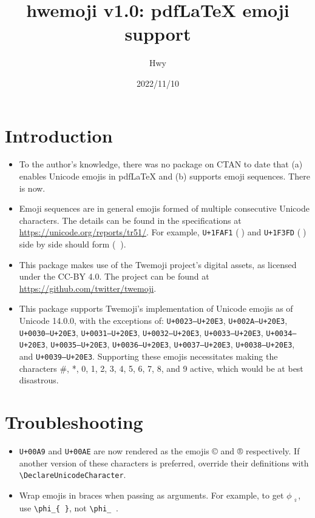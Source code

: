\documentclass{article}
\title{hwemoji v1.0: pdf\LaTeX{} emoji support}
\author{Hwy}
\date{2022/11/10}
\begin{document}
\maketitle

\section*{Introduction}
\begin{itemize}
    \item To the author's knowledge, there was no package on CTAN to date that (a) enables Unicode emojis in pdf\LaTeX{} and (b) supports emoji sequences. There is now.
    \item Emoji sequences are in general emojis formed of multiple consecutive Unicode characters. The details can be found in the specifications at \url{https://unicode.org/reports/tr51/}. For example, {\tt U+1FAF1} (🫱) and {\tt U+1F3FD} (🏽) side by side should form (🫱🏽).
    \item This package makes use of the Twemoji project's digital assets, as licensed under the CC-BY 4.0. The project can be found at \url{https://github.com/twitter/twemoji}.
    \item This package supports Twemoji's implementation of Unicode emojis as of Unicode 14.0.0, with the exceptions of: {\tt U+0023--U+20E3}, {\tt U+002A--U+20E3}, {\tt U+0030--U+20E3}, {\tt U+0031--U+20E3}, {\tt U+0032--U+20E3}, {\tt U+0033--U+20E3}, {\tt U+0034--U+20E3}, {\tt U+0035--U+20E3}, {\tt U+0036--U+20E3}, {\tt U+0037--U+20E3}, {\tt U+0038--U+20E3}, and {\tt U+0039--U+20E3}. Supporting these emojis necessitates making the characters \#, *, 0, 1, 2, 3, 4, 5, 6, 7, 8, and 9 active, which would be at best disastrous.
\end{itemize}

\section*{Troubleshooting}
\begin{itemize}
    \item {\tt U+00A9} and {\tt U+00AE} are now rendered as the emojis © and ® respectively. If another version of these characters is preferred, override their definitions with \verb|\DeclareUnicodeCharacter|.
    \item Wrap emojis in braces when passing as arguments. For example, to get $\phi_{🙆‍♀️}$, use \verb|\phi_{|🙆‍♀️\verb|}|, not \verb|\phi_|🙆‍♀️.
\end{itemize}
\end{document}
